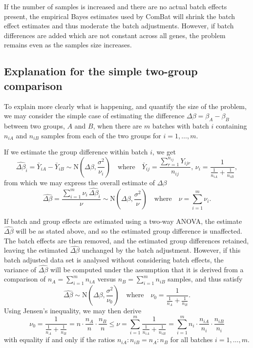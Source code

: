 \documentclass{bio}
\begin{document}
If the number of samples is increased and there are no actual batch effects present, the empirical Bayes estimates used by ComBat will shrink the batch effect estimates and thus moderate the batch adjustments. However, if batch differences are added which are not constant across all genes, the problem remains even as the samples size increases.

\subsection{Explanation for the simple two-group comparison}
\label{sec:twogroups}

To explain more clearly what is happening, and quantify the size of the problem, we may consider the simple case of estimating the difference $\Delta\beta=\beta_A-\beta_B$ between two groups, $A$ and $B$, when there are $m$ batches with batch $i$ containing $n_{iA}$ and $n_{iB}$ samples from each of the two groups for $i=1,\ldots,m$.

If we estimate the group difference within batch $i$, we get
\begin{equation}
\widehat{\Delta\beta}_i=\bar{Y}_{iA}-\bar{Y}_{iB}\sim\text{N}\left(\Delta\beta,\frac{\sigma^2}{\nu_i}\right)
\quad\text{where}\quad
\bar{Y}_{ij}=\frac{\sum_{r=1}^{n_{ij}}Y_{ijr}}{n_{ij}},\,
\nu_i=\frac{1}{\frac{1}{n_{iA}}+\frac{1}{n_{iB}}},
\end{equation}
from which we may express the overall estimate of $\Delta\beta$
\begin{equation}
\widehat{\Delta\beta}=\frac{\sum_{i=1}^m \nu_i\,\widehat{\Delta\beta}_i}{\nu}
\sim\text{N}\left(\Delta\beta,\frac{\sigma^2}{\nu}\right)
\quad\text{where}\quad
\nu=\sum_{i=1}^m\nu_i.
\end{equation}

If batch and group effects are estimated using a two-way ANOVA, the estimate $\widehat{\Delta\beta}$ will be as stated above, and so the estimated group difference is unaffected. The batch effects are then removed, and the estimated group differences retained, leaving the estimated $\widehat{\Delta\beta}$ unchanged by the batch adjustment. However, if this batch adjusted data set is analysed without considering batch effects, the variance of $\widehat{\Delta\beta}$ will be computed under the assumption that it is derived from a comparison of $n_A=\sum_{i=1}^m n_{iA}$ versus $n_B=\sum_{i=1}^m n_{iB}$ samples, and thus satisfy
\begin{equation}
\widehat{\Delta\beta}
\sim\text{N}\left(\Delta\beta,\frac{\sigma^2}{\nu_0}\right)
\quad\text{where}\quad
\nu_0=\frac{1}{\frac{1}{n_A}+\frac{1}{n_B}}.
\end{equation}
Using Jensen's inequality, we may then derive
\begin{equation}
\nu_0
=\frac{1}{\frac{1}{n_A}+\frac{1}{n_B}}=n\cdot\frac{n_A}{n}\cdot\frac{n_B}{n}
\le
\nu
=\sum_{i=1}^m \frac{1}{\frac{1}{n_{iA}}+\frac{1}{n_{iB}}}
=\sum_{i=1}^m n_i\cdot\frac{n_{iA}}{n_i}\cdot\frac{n_{iB}}{n_i}
\end{equation}
with equality if and only if the ratios $n_{iA}:n_{iB}=n_A:n_B$ for all batches $i=1,\ldots,m$.
\end{document}
